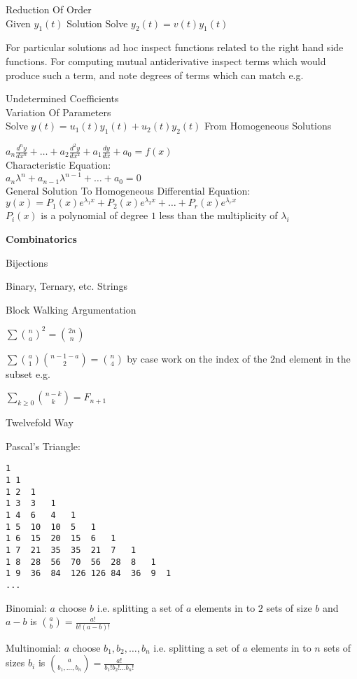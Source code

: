 Reduction Of Order \\
Given $y_1(t)$ Solution Solve $y_2(t)=v(t)y_1(t)$

For particular solutions ad hoc inspect functions related to the right hand side functions. For computing mutual antiderivative inspect terms which would produce such a term, and note degrees of terms which can match e.g.

Undetermined Coefficients \\
Variation Of Parameters \\
Solve $y(t)=u_1(t)y_1(t)+u_2(t)y_2(t)$ From Homogeneous Solutions

$a_n \frac{d^n y}{d x^n}+\dots+a_2 \frac{d^2 y}{d x^2}+a_1 \frac{dy}{dx} + a_0 = f(x)$ \\
Characteristic Equation: \\
$a_n \lambda^n + a_{n-1} \lambda^{n-1} + \dots + a_0 = 0$ \\
General Solution To Homogeneous Differential Equation: \\
$y(x)=P_1 (x)e^{\lambda_1 x}+P_2 (x) e^{\lambda_2 x} + \dots + P_r (x) e^{\lambda_r x}$ \\
$P_i (x)$ is a polynomial of degree $1$ less than the multiplicity of $\lambda_i$

\newpage

\textbf{Combinatorics}

Bijections

Binary, Ternary, etc. Strings

Block Walking Argumentation

$\sum \binom{n}{a}^2 = \binom{2n}{n}$

$\sum \binom{a}{1} \binom{n-1-a}{2} = \binom{n}{4}$ by case work on the index of the $2$nd element in the subset e.g.

$\sum_{k \ge 0} \binom{n-k}{k} = F_{n+1}$

Twelvefold Way

Pascal's Triangle: \\
\begin{verbatim}
1
1 1
1 2  1
1 3  3   1
1 4  6   4   1
1 5  10  10  5   1
1 6  15  20  15  6   1
1 7  21  35  35  21  7   1
1 8  28  56  70  56  28  8   1
1 9  36  84  126 126 84  36  9  1
...
\end{verbatim}

Binomial: $a$ choose $b$ i.e. splitting a set of $a$ elements in to $2$ sets of size $b$ and $a-b$ is $\binom{a}{b}=\frac{a!}{b!(a-b)!}$

Multinomial: $a$ choose $b_1,b_2,\dots,b_n$ i.e. splitting a set of $a$ elements in to $n$ sets of sizes $b_i$ is $\binom{a}{b_1,\dots,b_n}=\frac{a!}{b_1!b_2!\dots b_n!}$


